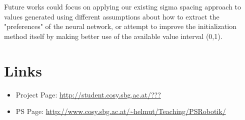 \documentclass[12pt,fleqn,a4paper]{article}
\begin{document}
Future works could focus on applying our existing sigma spacing approach to values generated using different assumptions about how to extract the "preferences" of the neural network, or attempt to improve the initialization method itself by making better use of the available value interval (0,1).

\section{Links}

\begin{itemize}
\item Project Page: \url{http://student.cosy.sbg.ac.at/???}
\item PS Page:
\url{http://www.cosy.sbg.ac.at/~helmut/Teaching/PSRobotik/}

\end{itemize}


\end{document}
